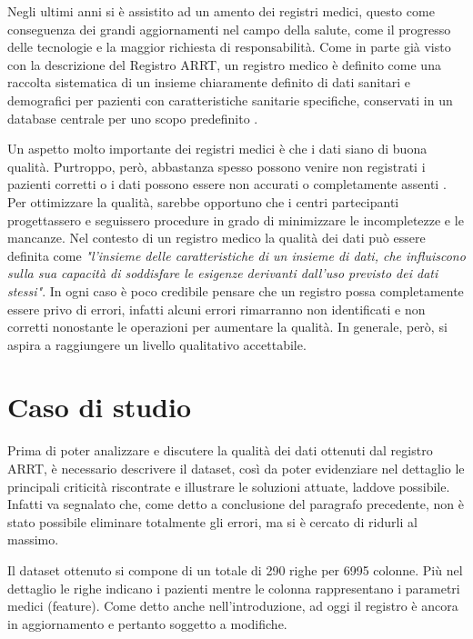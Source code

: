 Negli ultimi anni si è assistito ad un amento dei registri medici, questo come conseguenza dei grandi aggiornamenti nel campo della salute, come il progresso delle tecnologie e la maggior richiesta di responsabilità. Come in parte già visto con la descrizione del Registro ARRT, un registro medico è definito come una raccolta sistematica di un insieme chiaramente definito di dati sanitari e demografici per pazienti con caratteristiche sanitarie specifiche, conservati in un database centrale per uno scopo predefinito \cite{solomon1991evaluation}. 

Un aspetto molto importante dei registri medici è che i dati siano di buona qualità. Purtroppo, però, abbastanza spesso possono venire non registrati i pazienti corretti o i dati possono essere non accurati o completamente assenti \cite{goldhill1998apache,lorenzoni1999quality,seddon1997data,barrie1992quality,horbar1995assessment}. Per ottimizzare la qualità, sarebbe opportuno che i centri partecipanti progettassero e seguissero procedure in grado di minimizzare le incompletezze e le mancanze.
Nel contesto di un registro medico la qualità dei dati può essere definita come \textit{"l'insieme delle caratteristiche di un insieme di dati, che influiscono sulla sua capacità di soddisfare le esigenze derivanti dall'uso previsto dei dati stessi"}. 
In ogni caso è poco credibile pensare che un registro possa completamente essere privo di errori, infatti alcuni errori rimarranno non identificati e non corretti nonostante le operazioni per aumentare la qualità. In generale, però, si aspira a raggiungere un livello qualitativo accettabile\cite{arts2002defining}.




\section{Caso di studio}

Prima di poter analizzare e discutere la qualità dei dati ottenuti dal registro ARRT, è necessario descrivere il dataset, così da poter evidenziare nel dettaglio le principali criticità riscontrate e illustrare le soluzioni attuate, laddove possibile. Infatti va segnalato che, come detto a conclusione del paragrafo precedente, non è stato possibile eliminare totalmente gli errori, ma si è cercato di ridurli al massimo.

Il dataset ottenuto si compone di un totale di 290 righe per 6995 colonne.
Più nel dettaglio le righe indicano i pazienti mentre le colonna rappresentano i parametri medici (feature). Come detto anche nell'introduzione, ad oggi il registro è ancora in aggiornamento e pertanto soggetto a modifiche.

